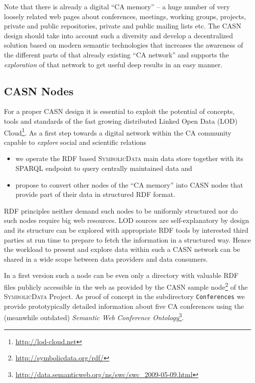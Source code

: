 \documentclass{mathincs}
\newcommand{\SD}{\textsc{Symbo\-lic\-Data}}
\begin{document}
Note that there is already a digital ``CA memory'' -- a huge number of very
loosely related web pages about conferences, meetings, working groups,
projects, private and public repositories, private and public mailing lists
etc. The CASN design should take into account such a diversity and develop a
decentralized solution based on modern semantic technologies that increases the
awareness of the different parts of that already existing ``CA network'' and
supports the \emph{exploration} of that network to get useful deep results in
an easy manner.

\subsection{CASN Nodes}

For a proper CASN design it is essential to exploit the potential of concepts,
tools and standards of the fast growing distributed Linked Open Data (LOD)
Cloud\footnote{ \url{http://lod-cloud.net}}.  As a first step towards a digital
network within the CA community capable to \emph{explore} social and scientific
relations
\begin{itemize}
\item we operate the RDF based {\SD} main data store together with its SPARQL
  endpoint \cite{sdsparql} to query centrally maintained data and
\item propose to convert other nodes of the ``CA memory'' into CASN nodes that
  provide part of their data in structured RDF format.
\end{itemize}
RDF principles neither demand such nodes to be uniformly structured nor do such
nodes require big web resources. LOD sources are self-explanatory by design and
its structure can be explored with appropriate RDF tools by interested third
parties at run time to prepare to fetch the information in a structured way.
Hence the workload to present and explore data within such a CASN network can be
shared in a wide scope between data providers and data consumers.

In a first version such a node can be even only a directory with valuable RDF
files publicly accessible in the web as provided by the CASN sample
node\footnote{ \url{http://symbolicdata.org/rdf/}} of the {\SD} Project. As
proof of concept in the subdirectory \texttt{Conferences} we provide
prototypically detailed information about five CA conferences using the
(meanwhile outdated) \emph{Semantic Web Conference Ontology}\footnote{
  \url{http://data.semanticweb.org/ns/swc/swc_2009-05-09.html}}.
\end{document}
